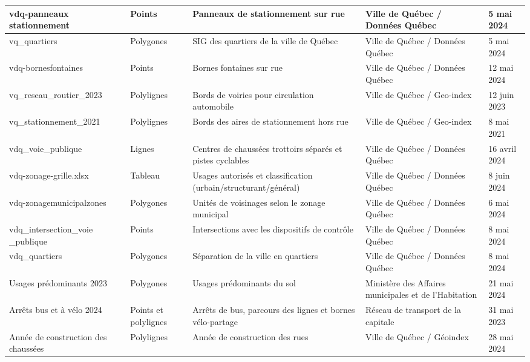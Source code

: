 \begin{landscape}
\begin{longtable}[h!]{p{.2 \linewidth} p{.1 \linewidth} p{.3 \linewidth} p{.15\linewidth} p{.125\linewidth} }
        
        vdq-panneaux stationnement    & Points        & Panneaux de stationnement sur rue          & Ville de Québec / Données Québec  & 5 mai 2024 \\
        \hline
        vq\_quartiers & Polygones & SIG des quartiers de la ville de Québec & Ville de Québec / Données Québec & 5 mai 2024 \\
        \hline
        vdq-bornesfontaines          & Points        & Bornes fontaines sur rue                   & Ville de Québec / Données Québec & 12 mai 2024 \\
        \hline
        vq\_reseau\_routier\_2023 & Polylignes    & Bords de voiries pour circulation automobile  & Ville de Québec / Geo-index  & 12 juin 2023\\ 
        \hline
        vq\_stationnement\_2021  & Polylignes    & Bords des aires de stationnement hors rue & Ville de Québec / Geo-index & 8 mai 2021\\
        \hline
        vdq\_voie\_publique            & Lignes        & Centres de chaussées trottoirs séparés et pistes cyclables & Ville de Québec / Données Québec & 16 avril 2024 \\
        \hline
        vdq-zonage-grille.xlsx          & Tableau        & Usages autorisés et classification (urbain/structurant/général) & Ville de Québec / Données Québec & 8 juin 2024 \\
        \hline
        vdq-zonagemunicipalzones          & Polygones        & Unités de voisinages selon le zonage municipal & Ville de Québec / Données Québec & 6 mai 2024 \\
        \hline
        vdq\_intersection\_voie \_publique & Points & Intersections avec les dispositifs de contrôle & Ville de Québec / Données Québec & 8 mai 2024 \\
        \hline
        vdq\_quartiers & Polygones &Séparation de la ville en quartiers & Ville de Québec / Données Québec & 8 mai 2024\\
        \hline
        Usages prédominants 2023  & Polygones & Usages prédominants du sol &   Ministère des Affaires municipales et de l'Habitation & 21 mai 2024 \\
        \hline
        Arrêts bus et à vélo 2024 & Points et polylignes & Arrêts de bus, parcours des lignes et bornes vélo-partage & Réseau de transport de la capitale & 31 mai 2023 \\
        \hline
        Année de construction des chaussées & Polylignes & Année de construction des rues & Ville de Québec / Géoindex & 28 mai 2024 \\

\end{longtable}
\end{landscape}

